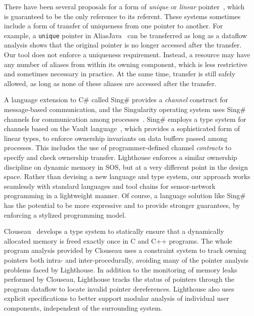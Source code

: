 There have been several proposals for a form of {\em unique} or {\em linear}
pointer~\cite{Boyland:2001:ABU,aliasjava,Wad90:linear}, which is guaranteed
to be the only reference to its referent.  
%
These systems sometimes include a form of transfer of uniqueness from one
pointer to another.
%
For example, a {\tt unique} pointer in AliasJava~\cite{aliasjava} can be
transferred as long as a dataflow analysis shows that the original pointer
is no longer accessed after the transfer.  
%
Our tool does not enforce a uniqueness requirement.
%
Instead, a resource may have any number of aliases from within its owning
component, which is less restrictive and sometimes necessary in practice.
%
At the same time, transfer is still safely allowed, as long as none of these
aliases are accessed after the transfer.



A language extension to C\# called Sing\# provides a {\em channel} construct
for message-based communication, and the Singularity operating system uses
Sing\# channels for communication among
processes~\cite{fahndrich06language}.  
%
Sing\# employs a type system for channels based on the Vault
language~\cite{Vault,adoption-focus}, which provides a sophisticated form of
linear types, to enforce ownership invariants on data buffers passed among
processes.  
%
This includes the use of programmer-defined channel {\em contracts} to
specify and check ownership transfer.
%
Lighthouse enforces a similar ownership discipline on dynamic memory in SOS,
but at a very different point in the design space.  
%
Rather than devising a new language and type system, our approach works
seamlessly with standard languages and tool chains for sensor-network
programming in a lightweight manner.  
%
Of course, a language solution like Sing\# has the potential to be more
expressive and to provide stronger guarantees, by enforcing a stylized
programming model.



Clouseau~\cite{heine03practical} develops a type system to statically ensure
that a dynamically allocated memory is freed exactly once in C and C++
programs.
%
The whole program analysis provided by Clouseau uses a constraint system to
track owning pointers both intra- and inter-procedurally, avoiding many of
the pointer analysis problems faced by Lighthouse.
%
In addition to the monitoring of memory leaks performed by Clouseau,
Lighthouse tracks the status of pointers through the program dataflow to
locate invalid pointer dereferences.
%
Lighthouse also uses explicit specifications to better support modular
analysis of individual user components, independent of the surrounding
system.

